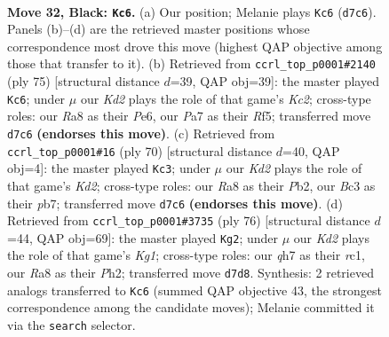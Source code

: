 \documentclass[11pt]{article}
\begin{document}
\clearpage

\begin{figure}[p]\centering
\begin{subfigure}{0.46\textwidth}\centering
\resizebox{\linewidth}{!}{%
\newchessgame
\chessboard[
  setfen={r7/p2k3Q/4p3/pq1p4/2rP2P1/2b5/2P5/3K2R1 b - - 6 32},
  showmover=false,
  pgfstyle=straightmove, color=movearrow, markmove={d7-c6}
]}
\caption{}
\end{subfigure}\hfill
\begin{subfigure}{0.46\textwidth}\centering
\resizebox{\linewidth}{!}{%
\newchessgame
\chessboard[
  setfen={8/Q1k5/3qp3/3p1rpp/1p6/1P6/P1P3P1/1K2R3 b - - 0 38},
  showmover=false,
  pgfstyle=straightmove, color=movearrow, markmove={c7-c6}
]}
\caption{}
\end{subfigure}
\\[4pt]
\begin{subfigure}{0.46\textwidth}\centering
\resizebox{\linewidth}{!}{%
\newchessgame
\chessboard[
  setfen={k3r3/1p3p2/p2p4/8/3Q1R1P/8/1PPK1P2/7q w - - 4 36},
  showmover=false,
  pgfstyle=straightmove, color=movearrow, markmove={d2-c3}
]}
\caption{}
\end{subfigure}\hfill
\begin{subfigure}{0.46\textwidth}\centering
\resizebox{\linewidth}{!}{%
\newchessgame
\chessboard[
  setfen={1k6/1p2q3/4P3/3B1pp1/b7/3R1P2/1P3Q1P/2r3K1 w - - 1 39},
  showmover=false,
  pgfstyle=straightmove, color=movearrow, markmove={g1-g2}
]}
\caption{}
\end{subfigure}
\caption{\textbf{Move 32, Black: \texttt{Kc6}.} (a) Our position; Melanie plays \texttt{Kc6} (\texttt{d7c6}). Panels (b)--(d) are the retrieved master positions whose correspondence most drove this move (highest QAP objective among those that transfer to it). (b) Retrieved from \texttt{ccrl\_top\_p0001\#2140} (ply 75) [structural distance $d$=39, QAP obj=39]: the master played \texttt{Kc6}; under $\mu$ our \emph{Kd2} plays the role of that game's \emph{Kc2}; cross-type roles: our \emph{R}a8 as their \emph{P}e6, our \emph{P}a7 as their \emph{R}f5; transferred move \texttt{d7c6} \textbf{(endorses this move)}. (c) Retrieved from \texttt{ccrl\_top\_p0001\#16} (ply 70) [structural distance $d$=40, QAP obj=4]: the master played \texttt{Kc3}; under $\mu$ our \emph{Kd2} plays the role of that game's \emph{Kd2}; cross-type roles: our \emph{R}a8 as their \emph{P}b2, our \emph{B}c3 as their \emph{p}b7; transferred move \texttt{d7c6} \textbf{(endorses this move)}. (d) Retrieved from \texttt{ccrl\_top\_p0001\#3735} (ply 76) [structural distance $d$=44, QAP obj=69]: the master played \texttt{Kg2}; under $\mu$ our \emph{Kd2} plays the role of that game's \emph{Kg1}; cross-type roles: our \emph{q}h7 as their \emph{r}c1, our \emph{R}a8 as their \emph{P}h2; transferred move \texttt{d7d8}. Synthesis: 2 retrieved analogs transferred to \texttt{Kc6} (summed QAP objective 43, the strongest correspondence among the candidate moves); Melanie committed it via the \texttt{search} selector.}
\label{fig:thought-m63}
\end{figure}
\end{document}
